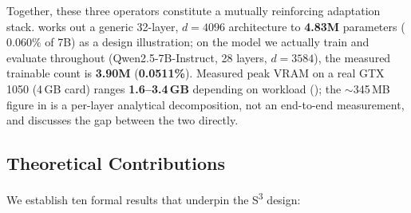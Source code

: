 \documentclass{scpe}
\newcommand{\sthree}{S\textsuperscript{3}}
\begin{document}
Together, these three operators constitute a mutually reinforcing adaptation stack.  works out a generic 32-layer, $d{=}4096$ architecture to \textbf{4.83M} parameters ($0.060\%$ of 7B) as a design illustration; on the model we actually train and evaluate throughout  (Qwen2.5-7B-Instruct, 28 layers, $d{=}3584$), the measured trainable count is \textbf{3.90M} (\textbf{0.0511\%}). Measured peak VRAM on a real GTX 1050 (4\,GB card) ranges \textbf{1.6--3.4\,GB} depending on workload (); the $\sim$345\,MB figure in  is a per-layer analytical decomposition, not an end-to-end measurement, and  discusses the gap between the two directly.

\subsection{Theoretical Contributions}

We establish ten formal results that underpin the \sthree{} design:
\end{document}
